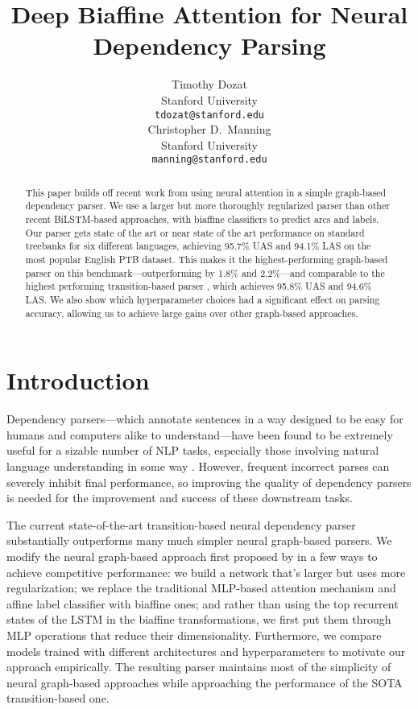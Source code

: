 \documentclass[11pt,a4paper]{article}
\title{Deep Biaffine Attention for Neural\\Dependency Parsing}
\author{
  Timothy Dozat\\
  Stanford University\\
  {\tt tdozat@stanford.edu} \\\And
  Christopher D.\ Manning\\
  Stanford University\\
  {\tt manning@stanford.edu}\\
}
\date{}
\begin{document}
\maketitle
\begin{abstract}
  This paper builds off recent work from \citet{KiperwasserGoldberg2016} using neural attention in a simple graph-based dependency parser. We use a larger but more thoroughly regularized parser than other recent BiLSTM-based approaches, with biaffine classifiers to predict arcs and labels. Our parser gets state of the art or near state of the art performance on standard treebanks for six different languages, achieving 95.7\%{} UAS and 94.1\%{} LAS on the most popular English PTB dataset. This makes it the highest-performing graph-based parser on this benchmark---outperforming \citet{KiperwasserGoldberg2016} by 1.8\%{} and 2.2\%{}---and comparable to the highest performing transition-based parser \citep{KuncoroBallesterosetal2016}, which achieves 95.8\%{} UAS and 94.6\%{} LAS. We also show which hyperparameter choices had a significant effect on parsing accuracy, allowing us to achieve large gains over other graph-based approaches.
\end{abstract}

\section{Introduction}
Dependency parsers---which annotate sentences in a way designed to be easy for humans and computers alike to understand---have been found to be extremely useful for a sizable number of NLP tasks, especially those involving natural language understanding in some way \citep{Bowmanetal2016, Angelietal2015, LevyGoldberg2014, Toutanovaetal2016, ParikhPoonToutanova2015}. However, frequent incorrect parses can severely inhibit final performance, so improving the quality of dependency parsers is needed for the improvement and success of these downstream tasks.

The current state-of-the-art transition-based neural dependency parser \citep{KuncoroBallesterosetal2016} substantially outperforms many much simpler neural graph-based parsers. We modify the neural graph-based approach first proposed by \citet{KiperwasserGoldberg2016} in a few ways to achieve competitive performance: we build a network that's larger but uses more regularization; we replace the traditional MLP-based attention mechanism and affine label classifier with biaffine ones; and rather than using the top recurrent states of the LSTM in the biaffine transformations, we first put them through MLP operations that reduce their dimensionality. Furthermore, we compare models trained with different architectures and hyperparameters to motivate our approach empirically. The resulting parser maintains most of the simplicity of neural graph-based approaches while approaching the performance of the SOTA transition-based one.
\end{document}
